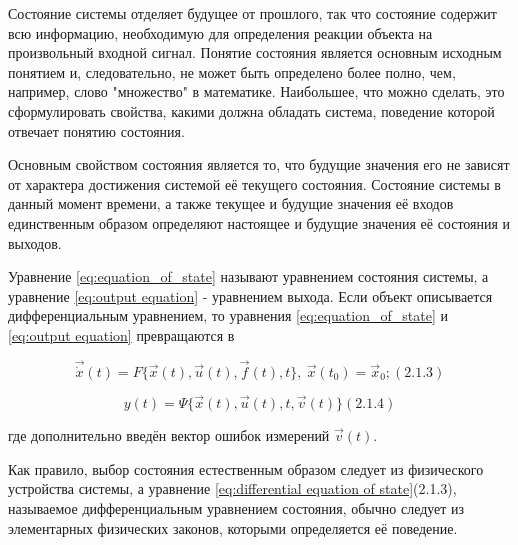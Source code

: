 		Состояние системы отделяет будущее от прошлого, так что состояние содержит всю информацию, необходимую для определения
		реакции объекта на произвольный входной сигнал. Понятие состояния является основным исходным понятием и, следовательно,
		не может быть определено более полно, чем, например, слово "множество" в математике. Наибольшее, что можно сделать, это
		сформулировать свойства, какими должна обладать система, поведение которой отвечает понятию состояния.



		Основным свойством состояния является то, что будущие значения его не зависят от характера достижения системой её
		текущего состо­яния. Состояние системы в данный момент времени, а также текущее и будущие значения её входов
		единственным образом определяют настоя­щее и будущие значения её состояния и выходов.



		Уравнение \eqref{eq:equation_of_state} называют уравнением состояния системы, а уравне­ние \eqref{eq:output equation} - уравнением выхода. Если объект
		описывается дифференциаль­ным уравнением, то уравнения \eqref{eq:equation_of_state} и \eqref{eq:output equation} превращаются в



\begin{equation}\label{eq:differential equation of state}
		  \vec{\dot x}(t)=F\{\vec x(t),\vec u(t),\vec f(t),t\}, \  \vec x(t_0)=\vec x_0; (2.1.3)
\end{equation}

\begin{equation}
	y(t)=\Psi\{\vec x(t),\vec u(t),t,\vec v(t)\} (2.1.4)
\end{equation}
		 
		где дополнительно введён вектор ошибок измерений  $\vec v(t)$.



		Как правило, выбор состояния естественным образом следует из физического устройства системы, а уравнение \eqref{eq:differential equation of state}(2.1.3),
		называемое диффе­ренциальным уравнением состояния, обычно следует из элементарных физических законов, которыми
		определяется её поведение.



